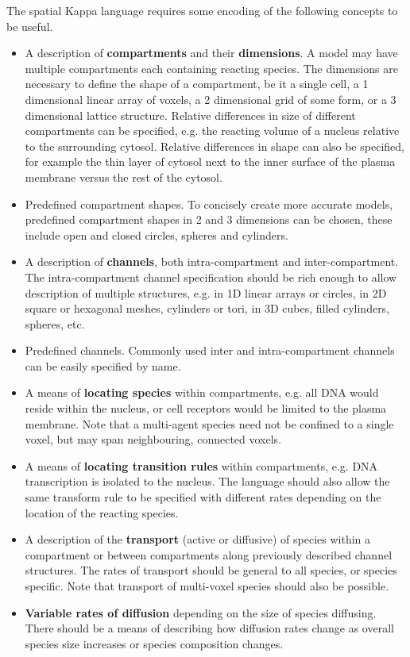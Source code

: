 The spatial Kappa language requires some encoding of the following concepts to be useful.

\begin{itemize}
 \item A description of \textbf{compartments} and their \textbf{dimensions}. A model may have multiple compartments each containing reacting species. The dimensions are necessary to define the shape of a compartment, be it a single cell, a 1 dimensional linear array of voxels, a 2 dimensional grid of some form, or a 3 dimensional lattice structure. Relative differences in size of different compartments can be specified, e.g. the reacting volume of a nucleus relative to the surrounding cytosol. Relative differences in shape can also be specified, for example the thin layer of cytosol next to the inner surface of the plasma membrane versus the rest of the cytosol.

 \item Predefined compartment shapes. To concisely create more accurate models, predefined compartment shapes in 2 and 3 dimensions can be chosen, these include open and closed circles, spheres and cylinders. 

 \item A description of \textbf{channels}, both intra-compartment and inter-compartment. The intra-compartment channel specification should be rich enough to allow description of multiple structures, e.g. in 1D linear arrays or circles, in 2D square or hexagonal meshes, cylinders or tori, in 3D cubes, filled cylinders, spheres, etc.

 \item Predefined channels. Commonly used inter and intra-compartment channels can be easily specified by name.

 \item A means of \textbf{locating species} within compartments, e.g. all DNA would reside within the nucleus, or cell receptors would be limited to the plasma membrane. Note that a multi-agent species need not be confined to a single voxel, but may span neighbouring, connected voxels.

 \item A means of \textbf{locating transition rules} within compartments, e.g. DNA transcription is isolated to the nucleus. The language should also allow the same transform rule to be specified with different rates depending on the location of the reacting species.

 \item A description of the \textbf{transport} (active or diffusive) of species within a compartment or between compartments along previously described channel structures. The rates of transport should be general to all species, or species specific. Note that transport of multi-voxel species should also be possible.

 \item \textbf{Variable rates of diffusion} depending on the size of species diffusing. There should be a means of describing how diffusion rates change as overall species size increases or species composition changes.

\end{itemize}


